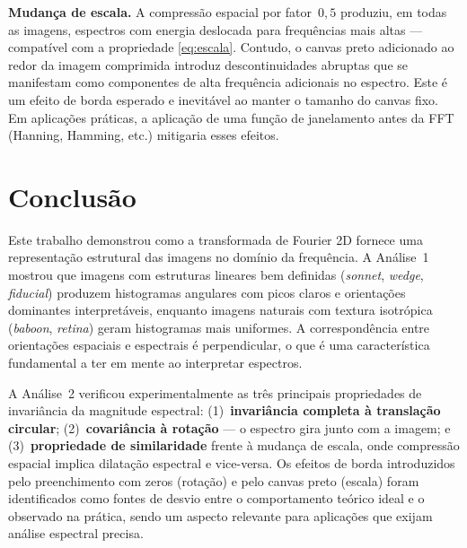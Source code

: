 \documentclass[12pt,a4paper]{article}
\newcommand{\campo}[2]{\textbf{#1.} #2\par}
\begin{document}
\campo{Mudança de escala}{A compressão espacial por fator~$0{,}5$ produziu, em todas
as imagens, espectros com energia deslocada para frequências mais altas — compatível
com a propriedade \eqref{eq:escala}. Contudo, o canvas preto adicionado ao redor da
imagem comprimida introduz descontinuidades abruptas que se manifestam como componentes
de alta frequência adicionais no espectro. Este é um efeito de borda esperado e
inevitável ao manter o tamanho do canvas fixo. Em aplicações práticas, a aplicação
de uma função de janelamento antes da FFT (Hanning, Hamming, etc.) mitigaria esses
efeitos.}

\section{Conclusão}
\label{sec:conclusao}

Este trabalho demonstrou como a transformada de Fourier 2D fornece uma representação
estrutural das imagens no domínio da frequência. A Análise~1 mostrou que imagens com
estruturas lineares bem definidas (\textit{sonnet}, \textit{wedge}, \textit{fiducial})
produzem histogramas angulares com picos claros e orientações dominantes interpretáveis,
enquanto imagens naturais com textura isotrópica (\textit{baboon}, \textit{retina})
geram histogramas mais uniformes. A correspondência entre orientações espaciais e
espectrais é perpendicular, o que é uma característica fundamental a ter em mente ao
interpretar espectros.

A Análise~2 verificou experimentalmente as três principais propriedades de invariância
da magnitude espectral: (1)~\textbf{invariância completa à translação circular};
(2)~\textbf{covariância à rotação} — o espectro gira junto com a imagem; e
(3)~\textbf{propriedade de similaridade} frente à mudança de escala, onde compressão
espacial implica dilatação espectral e vice-versa. Os efeitos de borda introduzidos
pelo preenchimento com zeros (rotação) e pelo canvas preto (escala) foram identificados
como fontes de desvio entre o comportamento teórico ideal e o observado na prática,
sendo um aspecto relevante para aplicações que exijam análise espectral precisa.
\end{document}
